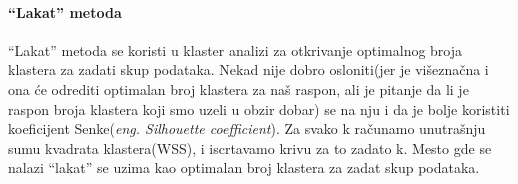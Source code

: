 \documentclass[11pt]{article}
\begin{document}
    \hypertarget{lakat-metoda}{%
\paragraph{``Lakat'' metoda}\label{lakat-metoda}}

``Lakat'' metoda se koristi u klaster analizi za otkrivanje optimalnog
broja klastera za zadati skup podataka. Nekad nije dobro osloniti(jer je
višeznačna i ona će odrediti optimalan broj klastera za naš raspon, ali
je pitanje da li je raspon broja klastera koji smo uzeli u obzir dobar)
se na nju i da je bolje koristiti koeficijent Senke(\emph{eng.
Silhouette coefficient}). Za svako k računamo unutrašnju sumu kvadrata
klastera(WSS), i iscrtavamo krivu za to zadato k. Mesto gde se nalazi
``lakat'' se uzima kao optimalan broj klastera za zadat skup podataka.
\end{document}
